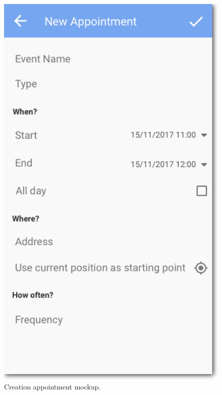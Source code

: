 \begin{figure}
	\centering
	\includegraphics[width=4.5in]{./images/appointment.png}
	\caption{Creation appointment mockup.}
	\label{fig:AppointmentCreationMockup}
\end{figure}